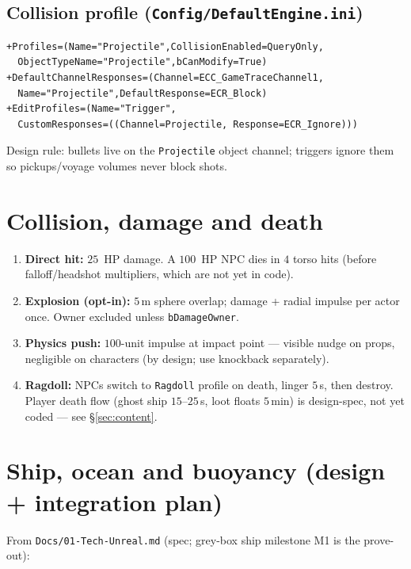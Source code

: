 \documentclass[11pt,a4paper]{article}
\begin{document}
\subsection{Collision profile (\texttt{Config/DefaultEngine.ini})}
\begin{lstlisting}
+Profiles=(Name="Projectile",CollisionEnabled=QueryOnly,
  ObjectTypeName="Projectile",bCanModify=True)
+DefaultChannelResponses=(Channel=ECC_GameTraceChannel1,
  Name="Projectile",DefaultResponse=ECR_Block)
+EditProfiles=(Name="Trigger",
  CustomResponses=((Channel=Projectile, Response=ECR_Ignore)))
\end{lstlisting}
Design rule: bullets live on the \texttt{Projectile} object channel; triggers ignore them so pickups/voyage volumes never block shots.

\section{Collision, damage and death}
\label{sec:collision}

\begin{enumerate}[leftmargin=1.4em]
  \item \textbf{Direct hit:} $25$~HP damage. A $100$~HP NPC dies in $4$ torso hits (before falloff/headshot multipliers, which are not yet in code).
  \item \textbf{Explosion (opt-in):} $5$\,m sphere overlap; damage + radial impulse per actor once. Owner excluded unless \texttt{bDamageOwner}.
  \item \textbf{Physics push:} $100$-unit impulse at impact point --- visible nudge on props, negligible on characters (by design; use knockback separately).
  \item \textbf{Ragdoll:} NPCs switch to \texttt{Ragdoll} profile on death, linger $5$\,s, then destroy. Player death flow (ghost ship $15$--$25$\,s, loot floats $5$\,min) is design-spec, not yet coded --- see \S\ref{sec:content}.
\end{enumerate}

\section{Ship, ocean and buoyancy (design + integration plan)}
\label{sec:ships}

From \texttt{Docs/01-Tech-Unreal.md} (spec; grey-box ship milestone M1 is the prove-out):
\end{document}
